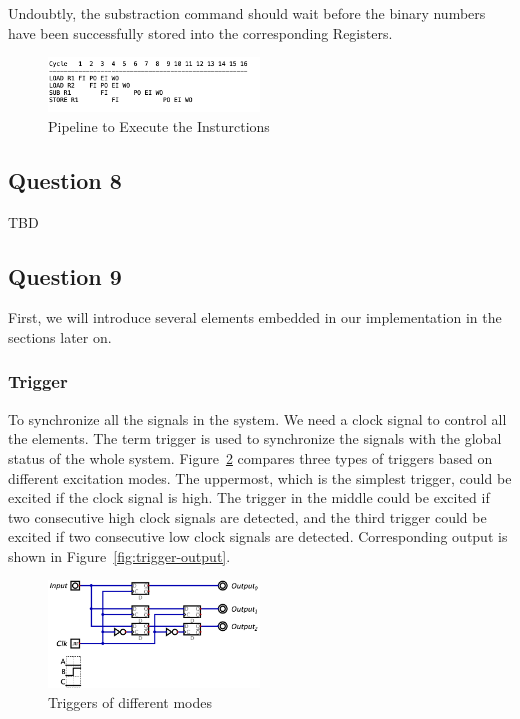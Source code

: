 \documentclass[conference]{IEEEtran}
\begin{document}
Undoubtly, the substraction command should wait before the binary numbers have been successfully stored into the corresponding Registers.

\begin{figure}[h!]
    \centering
    \includegraphics[width=0.5\textwidth]{assets/question-7.png}
    \caption{Pipeline to Execute the Insturctions}
    \label{fig:Question-7}
\end{figure}

\subsection{Question 8}


TBD

\subsection{Question 9}

First, we will introduce several elements embedded in our implementation in the sections later on.


\subsubsection{Trigger}



To synchronize all the signals in the system. We need a clock signal to control all the elements. The term trigger is used to synchronize the signals
with the global status of the whole system. Figure~\ref{fig:triggers} compares three types of triggers based on different excitation modes. The uppermost, which is the simplest trigger, could be excited if
the clock signal is high. The trigger in the middle could be excited if two consecutive high clock signals are detected, and the third trigger could be excited if two consecutive low clock signals are detected. Corresponding output is shown in Figure~\ref{fig:trigger-output}.

\begin{figure}[h!]
    \centering
    \includegraphics[width=0.5\textwidth]{assets/triggers.png}
    \caption{Triggers of different modes}
    \label{fig:triggers}
\end{figure}
\end{document}
